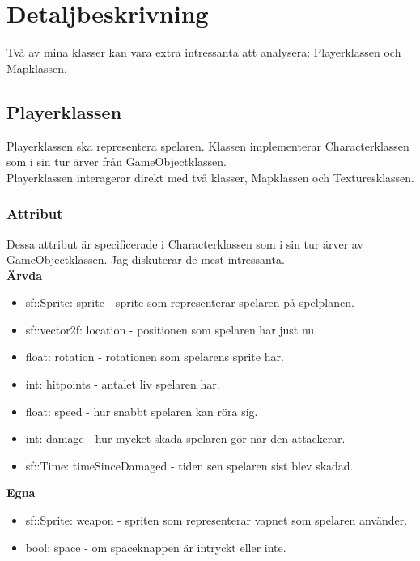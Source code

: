 \documentclass{TDP005mall}
\begin{document}
\section{Detaljbeskrivning}
Två av mina klasser kan vara extra intressanta att analysera: Playerklassen och Mapklassen.

\subsection{Playerklassen}
Playerklassen ska representera spelaren. Klassen implementerar Characterklassen som i sin tur ärver från GameObjectklassen. \\
Playerklassen interagerar direkt med två klasser, Mapklassen och Texturesklassen. 
\subsubsection{Attribut}
Dessa attribut är specificerade i Characterklassen som i sin tur ärver av GameObjectklassen.
Jag diskuterar de mest intressanta.\\
\textbf{Ärvda}
\begin{itemize}
  \item sf::Sprite: sprite - sprite som representerar spelaren på spelplanen.
  \item sf::vector2f: location - positionen som spelaren har just nu.
  \item float: rotation - rotationen som spelarens sprite har.
  \item int: hitpoints - antalet liv spelaren har.
  \item float: speed - hur snabbt spelaren kan röra sig.
  \item int: damage - hur mycket skada spelaren gör när den attackerar.
  \item sf::Time: timeSinceDamaged - tiden sen spelaren sist blev skadad.
\end{itemize}
\textbf{Egna}
\begin{itemize}
  \item sf::Sprite: weapon - spriten som representerar vapnet som spelaren använder.
  \item bool: space - om spaceknappen är intryckt eller inte.
\end{itemize}
\end{document}
